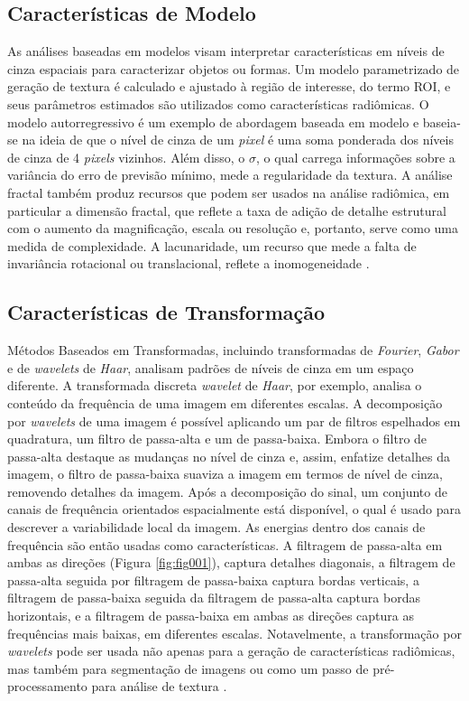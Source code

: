 \subsection{Características de Modelo}

As análises baseadas em modelos visam interpretar características em níveis de cinza espaciais para caracterizar objetos ou formas. Um modelo parametrizado de geração de textura é calculado e ajustado à região de interesse, do termo \gls{ROI}, e seus parâmetros estimados são utilizados como características radiômicas. O modelo autorregressivo é um exemplo de abordagem baseada em modelo e baseia-se na ideia de que o nível de cinza de um \textit{pixel} é uma soma ponderada dos níveis de cinza de 4 \textit{pixels} vizinhos. Além disso, o $\sigma$, o qual carrega informações sobre a variância do erro de previsão mínimo, mede a regularidade da textura. A análise fractal também produz recursos que podem ser usados na análise radiômica, em particular a dimensão fractal, que reflete a taxa de adição de detalhe estrutural com o aumento da magnificação, escala ou resolução e, portanto, serve como uma medida de complexidade. A lacunaridade, um recurso que mede a falta de invariância rotacional ou translacional, reflete a inomogeneidade \cite{mayerhoeferIntroductionRadiomics2020}.

\subsection{Características de Transformação}
Métodos Baseados em Transformadas, incluindo transformadas de \textit{Fourier}, \textit{Gabor} e de \textit{wavelets} de \textit{Haar}, analisam padrões de níveis de cinza em um espaço diferente. A transformada discreta \textit{wavelet} de \textit{Haar}, por exemplo, analisa o conteúdo da frequência de uma imagem em diferentes escalas. A decomposição por \textit{wavelets} de uma imagem é possível aplicando um par de filtros espelhados em quadratura, um filtro de passa-alta e um de passa-baixa. Embora o filtro de passa-alta destaque as mudanças no nível de cinza e, assim, enfatize detalhes da imagem, o filtro de passa-baixa suaviza a imagem em termos de nível de cinza, removendo detalhes da imagem. Após a decomposição do sinal, um conjunto de canais de frequência orientados espacialmente está disponível, o qual é usado para descrever a variabilidade local da imagem. As energias dentro dos canais de frequência são então usadas como características. A filtragem de passa-alta em ambas as direções (Figura \ref{fig:fig001}), captura detalhes diagonais, a filtragem de passa-alta seguida por filtragem de passa-baixa captura bordas verticais, a filtragem de passa-baixa seguida da filtragem de passa-alta captura bordas horizontais, e a filtragem de passa-baixa em ambas as direções captura as frequências mais baixas, em diferentes escalas. Notavelmente, a transformação por \textit{wavelets} pode ser usada não apenas para a geração de características radiômicas, mas também para segmentação de imagens ou como um passo de pré-processamento para análise de textura \cite{mayerhoeferIntroductionRadiomics2020}.


